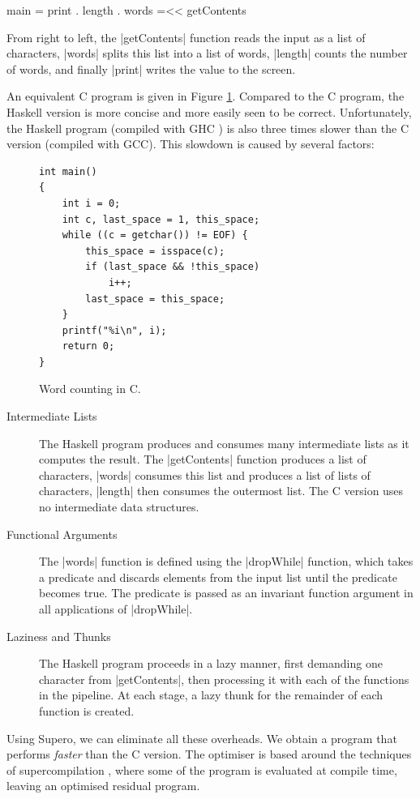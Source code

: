 \begin{code}
main = print . length . words =<< getContents
\end{code}

From right to left, the |getContents| function reads the input as a list of characters, |words| splits this list into a list of words, |length| counts the number of words, and finally |print| writes the value to the screen.

An equivalent C program is given in Figure \ref{figS:c_words}. Compared to the C program, the Haskell version is more concise and more easily seen to be correct. Unfortunately, the Haskell program (compiled with GHC \cite{ghc}) is also three times slower than the C version (compiled with GCC). This slowdown is caused by several factors:

\begin{figure}
\begin{verbatim}
int main()
{
	int i = 0;
	int c, last_space = 1, this_space;
	while ((c = getchar()) != EOF) {
		this_space = isspace(c);
		if (last_space && !this_space)
			i++;
		last_space = this_space;
	}
	printf("%i\n", i);
	return 0;
}
\end{verbatim}
\caption{Word counting in C.}
\label{figS:c_words}
\end{figure}

\begin{description}
\item[Intermediate Lists] The Haskell program produces and consumes many intermediate lists as it computes the result. The |getContents| function produces a list of characters, |words| consumes this list and produces a list of lists of characters, |length| then consumes the outermost list. The C version uses no intermediate data structures.
\item[Functional Arguments] The |words| function is defined using the |dropWhile| function, which takes a predicate and discards elements from the input list until the predicate becomes true. The predicate is passed as an invariant function argument in all applications of |dropWhile|.
\item[Laziness and Thunks] The Haskell program proceeds in a lazy manner, first demanding one character from |getContents|, then processing it with each of the functions in the pipeline. At each stage, a lazy thunk for the remainder of each function is created.
\end{description}

Using Supero, we can eliminate all these overheads. We obtain a program that performs \textit{faster} than the C version. The optimiser is based around the techniques of supercompilation \cite{supercompilation}, where some of the program is evaluated at compile time, leaving an optimised residual program.


